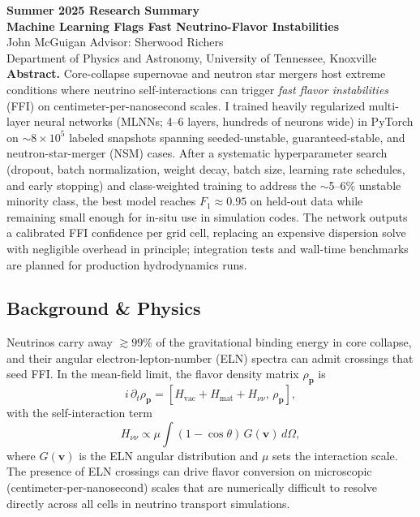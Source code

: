 \documentclass[10pt]{article}
\begin{document}
\begin{center}
{\Large \textbf{Summer 2025 Research Summary}}\\[2pt]
{\large \textbf{Machine Learning Flags Fast Neutrino-Flavor Instabilities}}\\[4pt]
John McGuigan \quad Advisor: Sherwood Richers\\
Department of Physics and Astronomy, University of Tennessee, Knoxville\\

\textbf{Abstract.}
Core-collapse supernovae and neutron star mergers host extreme conditions where neutrino self-interactions can trigger \emph{fast flavor instabilities} (FFI) on centimeter-per-nanosecond scales.
I trained heavily regularized multi-layer neural networks (MLNNs; 4--6 layers, hundreds of neurons wide) in PyTorch on $\sim 8\times 10^5$ labeled snapshots spanning seeded-unstable, guaranteed-stable, and neutron-star-merger (NSM) cases.
After a systematic hyperparameter search (dropout, batch normalization, weight decay, batch size, learning rate schedules, and early stopping) and class-weighted training to address the $\sim$5--6\% unstable minority class, the best model reaches $F_1 \approx 0.95$ on held-out data while remaining small enough for in-situ use in simulation codes.
The network outputs a calibrated FFI confidence per grid cell, replacing an expensive dispersion solve with negligible overhead in principle; integration tests and wall-time benchmarks are planned for production hydrodynamics runs.

\subsection*{Background \& Physics}
Neutrinos carry away $\gtrsim 99\%$ of the gravitational binding energy in core collapse, and their angular electron-lepton-number (ELN) spectra can admit crossings that seed FFI.
In the mean-field limit, the flavor density matrix $\rho_{\mathbf{p}}$ is
\begin{equation*}
i\,\partial_t \rho_{\mathbf{p}} = \left[ H_{\mathrm{vac}} + H_{\mathrm{mat}} + H_{\nu\nu}, \, \rho_{\mathbf{p}} \right],
\end{equation*}
with the self-interaction term
\begin{equation*}
H_{\nu\nu} \propto \mu \!\int (1-\cos\theta)\, G(\mathbf{v})\, d\Omega,
\end{equation*}
where $G(\mathbf{v})$ is the ELN angular distribution and $\mu$ sets the interaction scale. The presence of ELN crossings can drive flavor conversion on microscopic (centimeter-per-nanosecond) scales that are numerically difficult to resolve directly across all cells in neutrino transport simulations.


\end{center}
\end{document}
